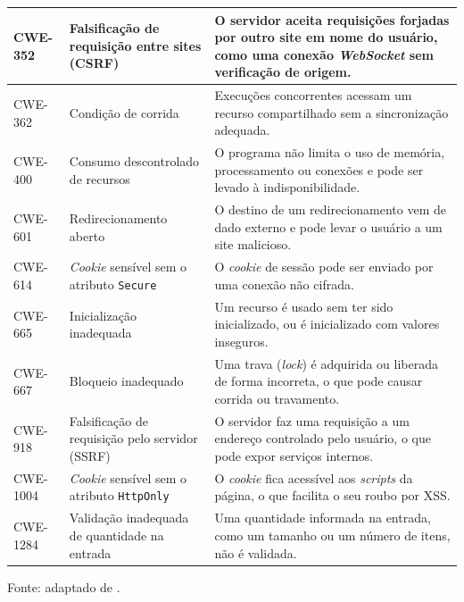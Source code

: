 \begin{apendicesenv}
{\begin{longtable}{|>{\footnotesize}l|>{\footnotesize\raggedright\arraybackslash}p{4.3cm}|>{\footnotesize\raggedright\arraybackslash}p{8.4cm}|}
        \hline
        CWE-352 & Falsificação de requisição entre sites (CSRF) & O servidor aceita requisições forjadas por outro site em nome do usuário, como uma conexão \textit{WebSocket} sem verificação de origem. \\
        \hline
        CWE-362 & Condição de corrida & Execuções concorrentes acessam um recurso compartilhado sem a sincronização adequada. \\
        \hline
        CWE-400 & Consumo descontrolado de recursos & O programa não limita o uso de memória, processamento ou conexões e pode ser levado à indisponibilidade. \\
        \hline
        CWE-601 & Redirecionamento aberto & O destino de um redirecionamento vem de dado externo e pode levar o usuário a um site malicioso. \\
        \hline
        CWE-614 & \textit{Cookie} sensível sem o atributo \texttt{Secure} & O \textit{cookie} de sessão pode ser enviado por uma conexão não cifrada. \\
        \hline
        CWE-665 & Inicialização inadequada & Um recurso é usado sem ter sido inicializado, ou é inicializado com valores inseguros. \\
        \hline
        CWE-667 & Bloqueio inadequado & Uma trava (\textit{lock}) é adquirida ou liberada de forma incorreta, o que pode causar corrida ou travamento. \\
        \hline
        CWE-918 & Falsificação de requisição pelo servidor (SSRF) & O servidor faz uma requisição a um endereço controlado pelo usuário, o que pode expor serviços internos. \\
        \hline
        CWE-1004 & \textit{Cookie} sensível sem o atributo \texttt{HttpOnly} & O \textit{cookie} fica acessível aos \textit{scripts} da página, o que facilita o seu roubo por XSS. \\
        \hline
        CWE-1284 & Validação inadequada de quantidade na entrada & Uma quantidade informada na entrada, como um tamanho ou um número de itens, não é validada. \\
        \hline
\end{longtable}
}
{\centering\footnotesize Fonte: adaptado de .\par}

\end{apendicesenv}
